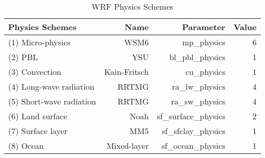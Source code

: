 \documentclass[phd,tocprelim]{cornell}
\begin{document}
\clearpage
\newpage



\begin{table}[!tbp]
\centering
\begin{tabular}{lrrr}
\toprule
             Physics Schemes &  Name & Parameter & Value \\ 
\midrule
            (1) Micro-physics &     WSM6 &  mp\_physics & 6 \\  
            (2) PBL &    YSU &  bl\_pbl\_physics &  1 \\    
            (3) Convection &   Kain-Fritsch &  cu\_physics & 1 \\    
            (4) Long-wave radiation &    RRTMG &   ra\_lw\_physics & 4 \\    
            (5) Short-wave radiation &    RRTMG &   ra\_sw\_physics & 4 \\    
            (6) Land surface &   Noah &   sf\_surface\_physics & 2 \\    
            (7) Surface layer &    MM5 &  sf\_sfclay\_physics &  1 \\    
            (8) Ocean &    Mixed-layer &  sf\_ocean\_physics &  1 \\    
\bottomrule
\end{tabular}
\caption{WRF Physics Schemes}
\label{wrf:specs}
\end{table}
\end{document}
